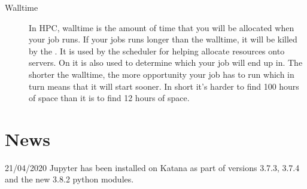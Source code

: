 \documentclass[letterpaper,10pt,english]{sphinxmanual}
\begin{document}
\begin{description}
\item[{Walltime\label{\detokenize{glossary:term-Walltime}}}] \leavevmode
In HPC, walltime is the amount of time that you will be allocated when your job runs. If your jobs runs longer than the walltime, it will be killed by the {\hyperref[\detokenize{glossary:term-Job-Scheduler}]{}}. It is used by the scheduler for helping allocate resources onto servers. On  it is also used to determine which {\hyperref[\detokenize{glossary:term-Queue}]{}} your job will end up in. The shorter the walltime, the more opportunity your job has to run which in turn means that it will start sooner. In short \sphinxhyphen{} it’s harder to find 100 hours of space than it is to find 12 hours of space.

\end{description}


\chapter{News}
\label{\detokenize{index:news}}
21/04/2020 \sphinxhyphen{} Jupyter has been installed on Katana as part of versions 3.7.3, 3.7.4 and the new 3.8.2 python modules.



\renewcommand{\indexname}{Index}
\printindex
\end{document}
